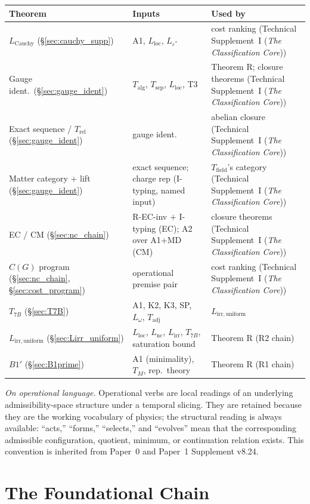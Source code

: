 \documentclass[11pt]{article}
\theoremstyle{definition}
\newcommand{\eps}{\varepsilon}
\newcommand{\TSI}{Technical Supplement~I (\emph{The Classification Core})}
\begin{document}
\smallskip
\begin{center}\footnotesize
\renewcommand{\arraystretch}{1.15}
\begin{tabular}{@{}lp{4.7cm}p{4.5cm}@{}}
\toprule
\textbf{Theorem} & \textbf{Inputs} & \textbf{Used by} \\
\midrule
$L_{\mathrm{Cauchy}}$ (\S\ref{sec:cauchy_supp}) & A1, $L_{\mathrm{loc}}$, $L_{\eps^*}$ & cost ranking (\TSI) \\
Gauge ident.\ (\S\ref{sec:gauge_ident}) & $T_{\mathrm{alg}}$, $T_{\mathrm{sep}}$, $L_{\mathrm{loc}}$, T3 & Theorem R; closure theorems (\TSI) \\
Exact sequence / $T_{\mathrm{rel}}$ (\S\ref{sec:gauge_ident}) & gauge ident. & abelian closure (\TSI) \\
Matter category $+$ lift (\S\ref{sec:gauge_ident}) & exact sequence; charge rep (I-typing, named input) & $T_{\mathrm{field}}$'s category (\TSI) \\
EC / CM (\S\ref{sec:nc_chain}) & R-EC-inv $+$ I-typing (EC); A2 over A1$+$MD (CM) & closure theorems (\TSI) \\
$C(G)$ program (\S\ref{sec:nc_chain}, \S\ref{sec:cost_program}) & operational premise pair & cost ranking (\TSI) \\
$T_{7B}$ (\S\ref{sec:T7B}) & A1, K2, K3, SP, $L_\omega$, $T_{\mathrm{adj}}$ & $L_{\mathrm{irr,uniform}}$ \\
$L_{\mathrm{irr,uniform}}$ (\S\ref{sec:Lirr_uniform}) & $L_{\mathrm{loc}}$, $L_{\mathrm{nc}}$, $L_{\mathrm{irr}}$, $T_{7B}$, saturation bound & Theorem R (R2 chain) \\
$B1'$ (\S\ref{sec:B1prime}) & A1 (minimality), $T_M$, rep.\ theory & Theorem R (R1 chain) \\
\bottomrule
\end{tabular}
\end{center}

\tableofcontents

\medskip
\noindent\textit{On operational language.}\quad
Operational verbs are local readings of an underlying admissibility-space
structure under a temporal slicing.  They are retained because they are the
working vocabulary of physics; the structural reading is always available:
``acts,'' ``forms,'' ``selects,'' and ``evolves'' mean that the corresponding
admissible configuration, quotient, minimum, or continuation relation exists.
This convention is inherited from Paper~0 and Paper~1 Supplement v8.24.


\newpage

\part{The Foundational Chain}
\label{part:chain}
\end{document}
